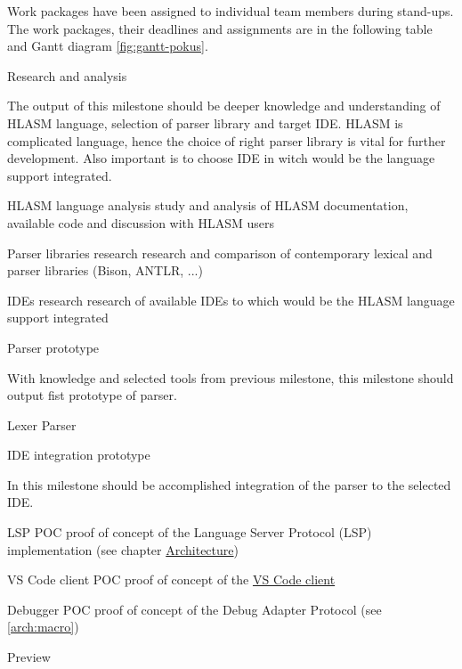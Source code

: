 Work packages have been assigned to individual team members during stand-ups. The work packages, their deadlines and assignments are in the following table and Gantt diagram \ref{fig:gantt-pokus}. 



\newpage

\bms
	\itemm Research and analysis 
	
		\small The output of this milestone should be deeper knowledge and understanding of HLASM language, selection of parser library and target IDE.
		HLASM is complicated language, hence the choice of right parser library is vital for further development. Also important is to choose IDE in witch would be the language support integrated.
	
		\bwp
			\itemwp HLASM language analysis 
					\tiny study and analysis of HLASM documentation, available code and discussion with HLASM users
					
			\itemwp Parser libraries research 
					\tiny research and comparison of contemporary lexical and parser libraries (Bison, ANTLR, ...) 
					
			\itemwp IDEs research 
					\tiny research of available IDEs to which would be the HLASM language support integrated
		\eenum
	
	
	\itemm Parser prototype 
	
		\small With knowledge and selected tools from previous milestone, this milestone should output fist prototype of parser.
	
		\bwp
			\itemwp Lexer 
			\itemwp Parser 
		\eenum
	
	
	\itemm IDE integration prototype 
	
		\small In this milestone should be accomplished integration of the parser to the selected IDE.
	
		\bwp
			\itemwp LSP POC 
					\tiny proof of concept of the Language Server Protocol (LSP) implementation (see chapter \hyperref[arch]{Architecture})
					
			\itemwp VS Code client POC 
					\tiny proof of concept of the \hyperref[arch:client]{VS Code client}
					
			\itemwp Debugger POC 
					\tiny proof of concept of the Debug Adapter Protocol (see \ref{arch:macro})
		\eenum
	
	
	\itemm \label{milestone_preview} Preview 
	
